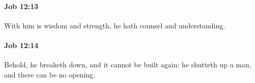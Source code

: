 		\paragraph{Job 12:13} %
			\label{JOB-12-13}

			With him is wisdom and strength, he hath counsel and understanding.


		\paragraph{Job 12:14} %
			\label{JOB-12-14}

			Behold, he breaketh down, and it cannot be built again: he shutteth up a man, and there can be no opening.


